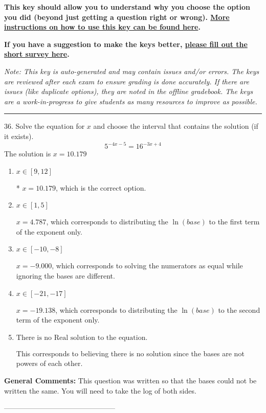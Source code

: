 \documentclass{extbook}[14pt]
\begin{document}
\textbf{This key should allow you to understand why you choose the option you did (beyond just getting a question right or wrong). \href{https://xronos.clas.ufl.edu/mac1105spring2020/courseDescriptionAndMisc/Exams/LearningFromResults}{More instructions on how to use this key can be found here}.}

\textbf{If you have a suggestion to make the keys better, \href{https://forms.gle/CZkbZmPbC9XALEE88}{please fill out the short survey here}.}

\textit{Note: This key is auto-generated and may contain issues and/or errors. The keys are reviewed after each exam to ensure grading is done accurately. If there are issues (like duplicate options), they are noted in the offline gradebook. The keys are a work-in-progress to give students as many resources to improve as possible.}

\rule{\textwidth}{0.4pt}

36. Solve the equation for $x$ and choose the interval that contains the solution (if it exists).
\[ 5^{-4x-5} = 16^{-3x+4} \] 
The solution is $ x = 10.179 $ 

\begin{enumerate}[label=\Alph*.] 
\item $ x \in [9, 12] $ 

 * $x = 10.179$, which is the correct option. 
\item $ x \in [1, 5] $ 

 $x = 4.787$, which corresponds to distributing the $\ln(base)$ to the first term of the exponent only. 
\item $ x \in [-10, -8] $ 

 $x = -9.000$, which corresponds to solving the numerators as equal while ignoring the bases are different. 
\item $ x \in [-21, -17] $ 

 $x = -19.138$, which corresponds to distributing the $\ln(base)$ to the second term of the exponent only. 
\item $ \text{There is no Real solution to the equation.} $ 

 This corresponds to believing there is no solution since the bases are not powers of each other. 
\end{enumerate} 
 
\textbf{General Comments:} This question was written so that the bases could not be written the same. You will need to take the log of both sides.

-----------------------------------------------
\end{document}
